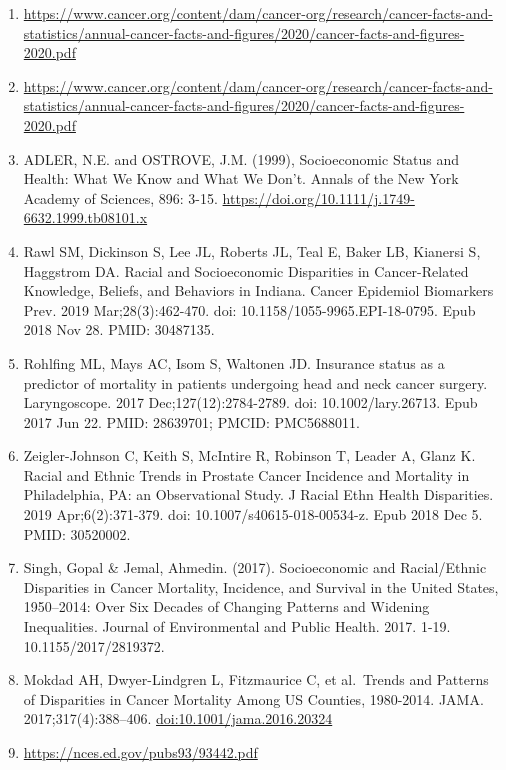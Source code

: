 \documentclass[
  11pt,
]{article}
\providecommand{\tightlist}{%
  \setlength{\itemsep}{0pt}\setlength{\parskip}{0pt}}
\begin{document}
\begin{enumerate}
\def\labelenumi{\arabic{enumi}.}
\tightlist
\item
  \url{https://www.cancer.org/content/dam/cancer-org/research/cancer-facts-and-statistics/annual-cancer-facts-and-figures/2020/cancer-facts-and-figures-2020.pdf}
\item
  \url{https://www.cancer.org/content/dam/cancer-org/research/cancer-facts-and-statistics/annual-cancer-facts-and-figures/2020/cancer-facts-and-figures-2020.pdf}
\item
  ADLER, N.E. and OSTROVE, J.M. (1999), Socioeconomic Status and Health:
  What We Know and What We Don't. Annals of the New York Academy of
  Sciences, 896: 3-15.
  \url{https://doi.org/10.1111/j.1749-6632.1999.tb08101.x}
\item
  Rawl SM, Dickinson S, Lee JL, Roberts JL, Teal E, Baker LB, Kianersi
  S, Haggstrom DA. Racial and Socioeconomic Disparities in
  Cancer-Related Knowledge, Beliefs, and Behaviors in Indiana. Cancer
  Epidemiol Biomarkers Prev. 2019 Mar;28(3):462-470. doi:
  10.1158/1055-9965.EPI-18-0795. Epub 2018 Nov 28. PMID: 30487135.
\item
  Rohlfing ML, Mays AC, Isom S, Waltonen JD. Insurance status as a
  predictor of mortality in patients undergoing head and neck cancer
  surgery. Laryngoscope. 2017 Dec;127(12):2784-2789. doi:
  10.1002/lary.26713. Epub 2017 Jun 22. PMID: 28639701; PMCID:
  PMC5688011.
\item
  Zeigler-Johnson C, Keith S, McIntire R, Robinson T, Leader A, Glanz K.
  Racial and Ethnic Trends in Prostate Cancer Incidence and Mortality in
  Philadelphia, PA: an Observational Study. J Racial Ethn Health
  Disparities. 2019 Apr;6(2):371-379. doi: 10.1007/s40615-018-00534-z.
  Epub 2018 Dec 5. PMID: 30520002.
\item
  Singh, Gopal \& Jemal, Ahmedin. (2017). Socioeconomic and
  Racial/Ethnic Disparities in Cancer Mortality, Incidence, and Survival
  in the United States, 1950--2014: Over Six Decades of Changing
  Patterns and Widening Inequalities. Journal of Environmental and
  Public Health. 2017. 1-19. 10.1155/2017/2819372.
\item
  Mokdad AH, Dwyer-Lindgren L, Fitzmaurice C, et al.~Trends and Patterns
  of Disparities in Cancer Mortality Among US Counties, 1980-2014. JAMA.
  2017;317(4):388--406. \url{doi:10.1001/jama.2016.20324}
\item
  \url{https://nces.ed.gov/pubs93/93442.pdf}
\end{enumerate}
\end{document}
